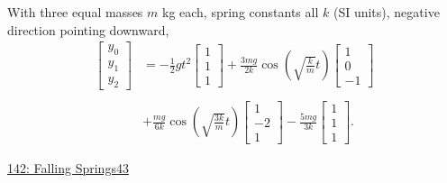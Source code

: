 \documentclass{ximera}
\begin{document}
With three equal masses $m$ kg each, spring constants all $k$ (SI units), negative direction pointing downward,
\begin{align*}
 \begin{bmatrix}
y_0\\
y_1 \\
y_2
\end{bmatrix} 
&=
-\frac{1}{2}gt^2 
 \begin{bmatrix}
1\\
1 \\
1
\end{bmatrix} 
+
\frac{3mg}{2k} \cos\left( \sqrt{\frac{k}{m}} t  \right)
 \begin{bmatrix}
1\\
0 \\
-1
\end{bmatrix}   \\ \\
& +  
\frac{mg}{6k} \cos\left( \sqrt{\frac{3k}{m}} t  \right)
 \begin{bmatrix}
1\\
-2 \\
1
\end{bmatrix}
-  
\frac{5mg}{3k}
 \begin{bmatrix}
1\\
1 \\
1
\end{bmatrix}.
\end{align*}

\begin{onlineOnly}
    \begin{center}
\end{center}
\end{onlineOnly}

\href{https://www.desmos.com/calculator/tnhnhzfnbu}{142: Falling Springs43}
\end{document}
